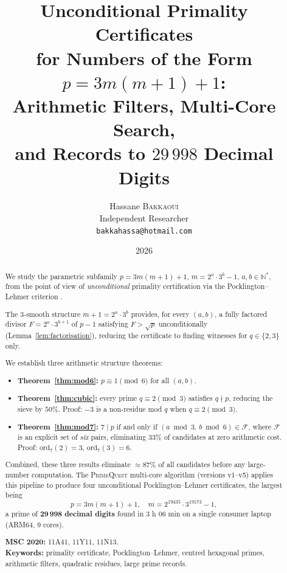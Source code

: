 \documentclass[11pt,a4paper]{article}
\title{Unconditional Primality Certificates\\
for Numbers of the Form $p = 3m(m+1)+1$:\\[4pt]
{\large Arithmetic Filters, Multi-Core Search,\\
and Records to $29\,998$ Decimal Digits}}
\author{Hassane \textsc{Bakkaoui}\\
\small Independent Researcher\\
\small \texttt{bakkahassa@hotmail.com}}
\date{2026}
\theoremstyle{definition}
\theoremstyle{remark}
\newcommand{\N}{\mathbb{N}}
\newcommand{\F}{\mathcal{F}}
\begin{document}
\maketitle

\begin{abstract}
We study the parametric subfamily $p = 3m(m+1)+1$, $m = 2^a\cdot 3^b - 1$,
$a,b \in \N^*$, from the point of view of \emph{unconditional} primality
certification via the Pocklington--Lehmer criterion
\cite{Pocklington1914,LehmerPSW1975}.

The 3-smooth structure $m+1 = 2^a\cdot 3^b$ provides, for every $(a,b)$,
a fully factored divisor $F = 2^a\cdot 3^{b+1}$ of $p-1$ satisfying
$F>\sqrt{p}$ unconditionally (Lemma~\ref{lem:factorisation}), reducing
the certificate to finding witnesses for $q\in\{2,3\}$ only.

We establish three arithmetic structure theorems:
\begin{itemize}
\item \textbf{Theorem~\ref{thm:mod6}:}
  $p\equiv 1\pmod{6}$ for all $(a,b)$.
\item \textbf{Theorem~\ref{thm:cubic}:}
  every prime $q\equiv 2\pmod{3}$ satisfies $q\nmid p$,
  reducing the sieve by $50\%$.
  Proof: $-3$ is a non-residue mod $q$ when $q\equiv 2\pmod{3}$.
\item \textbf{Theorem~\ref{thm:mod7}:}
  $7\mid p$ if and only if $(a\bmod 3,\,b\bmod 6)\in\F$,
  where $\F$ is an explicit set of \emph{six} pairs,
  eliminating $33\%$ of candidates at zero arithmetic cost.
  Proof: $\mathrm{ord}_7(2)=3$, $\mathrm{ord}_7(3)=6$.
\end{itemize}

Combined, these three results eliminate $\approx 87\%$ of all candidates
before any large-number computation. The \textsc{PrimeQuest} multi-core
algorithm (versions v1--v5) applies this pipeline to produce four
unconditional Pocklington--Lehmer certificates, the largest being
\[
  p = 3m(m+1)+1,\quad m = 2^{19435}\cdot 3^{19173}-1,
\]
a prime of $\mathbf{29\,998}$ \textbf{decimal digits} found in
$3$ h $06$ min on a single consumer laptop (ARM64, 9 cores).

\smallskip
\noindent\textbf{MSC 2020:} 11A41, 11Y11, 11N13.\\
\textbf{Keywords:} primality certificate, Pocklington--Lehmer,
centred hexagonal primes, arithmetic filters, quadratic residues,
large prime records.
\end{abstract}
\end{document}
